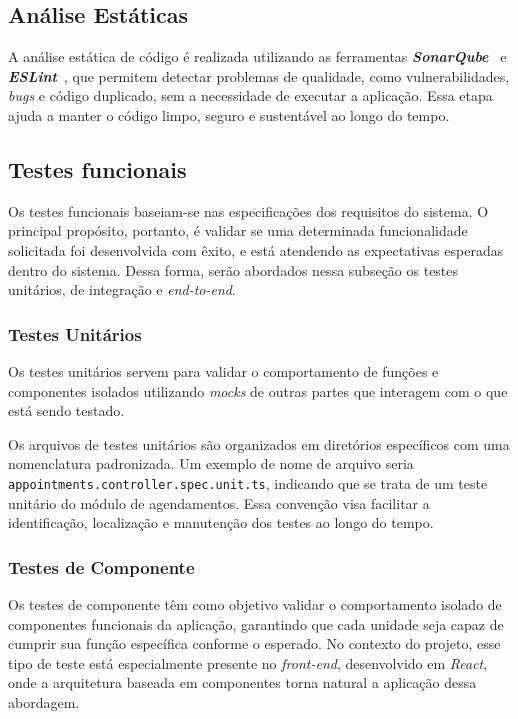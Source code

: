 \subsection{Análise Estáticas}
A análise estática de código é realizada utilizando as ferramentas \textbf{\textit{SonarQube}}~\cite{sonarqube-2025} e \textbf{\textit{ESLint}}~\cite{eslint-2025}, 
que permitem detectar problemas de qualidade, como vulnerabilidades, \textit{bugs} e código duplicado, sem a necessidade de executar a aplicação. Essa etapa ajuda a manter o código limpo, seguro e sustentável ao longo do tempo.

\subsection{Testes funcionais}
Os testes funcionais baseiam-se nas especificações dos requisitos do sistema. O principal propósito, portanto, é validar se uma determinada funcionalidade solicitada foi desenvolvida com êxito, e está atendendo as expectativas esperadas dentro do sistema. Dessa forma, serão abordados nessa subseção os testes unitários, de integração e \textit{end-to-end}. 

\subsubsection{Testes Unitários}
Os testes unitários servem para validar o comportamento de funções e componentes isolados utilizando \textit{mocks} de outras partes que interagem com o que está sendo testado.

Os arquivos de testes unitários são organizados em diretórios específicos com uma nomenclatura padronizada. Um exemplo de nome de arquivo seria \texttt{appointments.\allowbreak controller.\allowbreak spec.\allowbreak unit.ts}, indicando que se trata de um teste unitário do módulo de agendamentos. Essa convenção visa facilitar a identificação, localização e manutenção dos testes ao longo do tempo.

\subsubsection{Testes de Componente}
Os testes de componente têm como objetivo validar o comportamento isolado de componentes funcionais da aplicação, garantindo que cada unidade seja capaz de cumprir sua função específica conforme o esperado. No contexto do projeto, esse tipo de teste está especialmente presente no \textit{front-end}, desenvolvido em \textit{React}, onde a arquitetura baseada em componentes torna natural a aplicação dessa abordagem.

